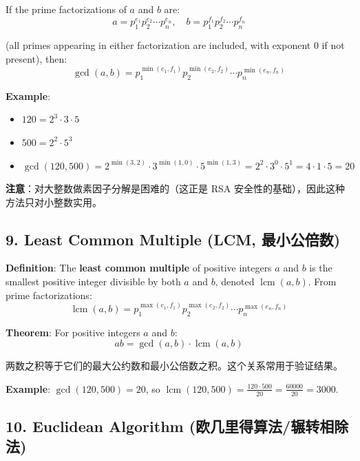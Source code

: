 \documentclass[10pt,a4paper,openany]{ctexbook}
\theoremstyle{definition}
\theoremstyle{remark}
\renewenvironment{quote}
  {\list{}{\leftmargin=1em\rightmargin=0pt\topsep=0.5pt\partopsep=0pt}\item[]}
  {\endlist}
\begin{document}
If the prime factorizations of $a$ and $b$ are:
\[
a = p_1^{e_1} p_2^{e_2} \cdots p_n^{e_n}, \quad b = p_1^{f_1} p_2^{f_2} \cdots p_n^{f_n}
\]

(all primes appearing in either factorization are included, with exponent 0 if not present), then:
\[
\gcd(a, b) = p_1^{\min(e_1, f_1)} p_2^{\min(e_2, f_2)} \cdots p_n^{\min(e_n, f_n)}
\]

\textbf{Example}:
\begin{itemize}
\item $120 = 2^3 \cdot 3 \cdot 5$
\item $500 = 2^2 \cdot 5^3$
\item $\gcd(120, 500) = 2^{\min(3,2)} \cdot 3^{\min(1,0)} \cdot 5^{\min(1,3)} = 2^2 \cdot 3^0 \cdot 5^1 = 4 \cdot 1 \cdot 5 = 20$

\end{itemize}

\begin{quote}
\textbf{注意}：对大整数做素因子分解是困难的（这正是 RSA 安全性的基础），因此这种方法只对小整数实用。

\end{quote}
\vspace{-2pt}

\subsection{9. Least Common Multiple (LCM, 最小公倍数)}

\textbf{Definition}: The \textbf{least common multiple} of positive integers $a$ and $b$ is the smallest positive integer divisible by both $a$ and $b$, denoted $\operatorname{lcm}(a, b)$.
From prime factorizations:
\[
\operatorname{lcm}(a, b) = p_1^{\max(e_1, f_1)} p_2^{\max(e_2, f_2)} \cdots p_n^{\max(e_n, f_n)}
\]

\textbf{Theorem}: For positive integers $a$ and $b$:
\[
ab = \gcd(a, b) \cdot \operatorname{lcm}(a, b)
\]

\begin{quote}
两数之积等于它们的最大公约数和最小公倍数之积。这个关系常用于验证结果。

\textbf{Example}: $\gcd(120, 500) = 20$, so $\operatorname{lcm}(120, 500) = \frac{120 \cdot 500}{20} = \frac{60000}{20} = 3000$.

\end{quote}
\vspace{-2pt}

\subsection{10. Euclidean Algorithm (欧几里得算法/辗转相除法)}
\end{document}
